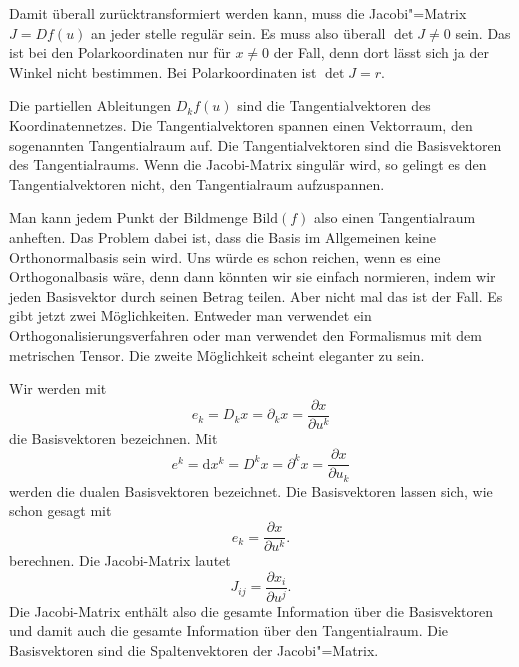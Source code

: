 \documentclass[a4paper,10pt,fleqn,twocolumn,twoside]{article}
\begin{document}
Damit überall zurücktransformiert werden kann, muss die
Jacobi"=Matrix $J=Df(u)$ an jeder stelle regulär sein. Es muss also
überall $\det J\neq 0$ sein. Das ist bei den Polarkoordinaten nur
für $x\neq 0$ der Fall, denn dort lässt sich ja der Winkel nicht
bestimmen. Bei Polarkoordinaten ist $\det J=r$.

Die partiellen Ableitungen $D_k f(u)$ sind die Tangentialvektoren
des Koordinatennetzes. Die Tangentialvektoren spannen einen
Vektorraum, den sogenannten Tangentialraum auf. Die
Tangentialvektoren sind die Basisvektoren des Tangentialraums.
Wenn die Jacobi-Matrix singulär wird, so gelingt es den
Tangentialvektoren nicht, den Tangentialraum aufzuspannen.

Man kann jedem Punkt der Bildmenge $\mathrm{Bild}(f)$ also einen
Tangentialraum anheften. Das Problem dabei ist, dass die Basis im
Allgemeinen keine Orthonormalbasis sein wird. Uns würde es schon
reichen, wenn es eine Orthogonalbasis wäre, denn dann könnten wir sie
einfach normieren, indem wir jeden Basisvektor durch seinen Betrag
teilen. Aber nicht mal das ist der Fall. Es gibt jetzt zwei
Möglichkeiten. Entweder man verwendet ein Orthogonalisierungsverfahren
oder man verwendet den Formalismus mit dem metrischen Tensor.
Die zweite Möglichkeit scheint eleganter zu sein.

Wir werden mit
\[e_k = D_kx = \partial_kx = \frac{\partial x}{\partial u^k}\]
die Basisvektoren bezeichnen. Mit
\[e^k = \mathrm dx^k = D^kx = \partial^kx = \frac{\partial x}{\partial u_k}\]
werden die dualen Basisvektoren bezeichnet. Die Basisvektoren lassen
sich, wie schon gesagt mit
\[e_k = \frac{\partial x}{\partial u^k}.\]
berechnen. Die Jacobi-Matrix lautet
\[J_{ij} = \frac{\partial x_i}{\partial u^j}.\]
Die Jacobi-Matrix enthält also die gesamte Information über die
Basisvektoren und damit auch die gesamte Information über den
Tangentialraum. Die Basisvektoren sind die Spaltenvektoren der
Jacobi"=Matrix.
\end{document}
